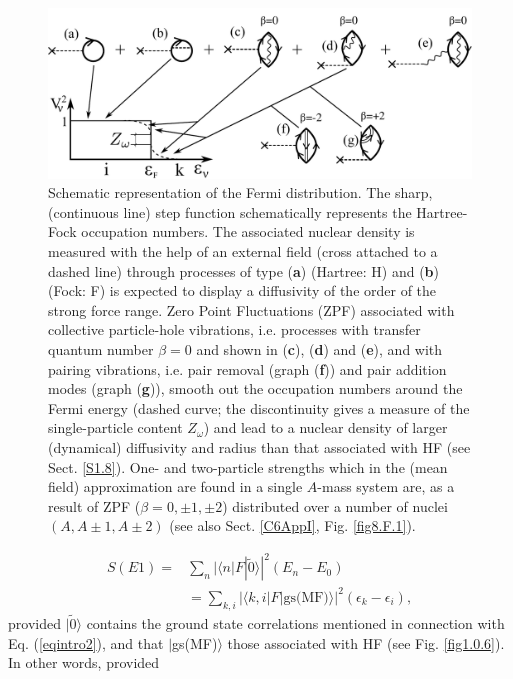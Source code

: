 \begin{figure}
\centerline {
\includegraphics*[width=12cm]{introduccion/figs/fig1_2_2}
}
\caption{   Schematic representation of the Fermi distribution. The sharp, (continuous line)  step function schematically represents the Hartree-Fock occupation numbers. The associated nuclear density is measured with the help of an external field (cross attached to a dashed line) through processes of type (\textbf{a}) (Hartree: H) and (\textbf{b}) (Fock: F) is expected to display a diffusivity of the order of the strong force range. Zero Point Fluctuations (ZPF) associated with collective particle-hole vibrations, i.e. processes with transfer quantum number $\beta=0$  and shown in (\textbf{c}), (\textbf{d}) and (\textbf{e}), and with pairing vibrations, i.e. pair removal (graph (\textbf{f})) and pair addition modes (graph (\textbf{g})), smooth out the occupation numbers around the Fermi energy (dashed curve; the discontinuity gives a measure of the single-particle content $Z_\omega$) and lead to a  nuclear density of larger (dynamical) diffusivity and radius than that associated with HF (see Sect. \ref{S1.8}). One- and two-particle strengths which in the (mean field) approximation are found in a single $A$-mass system are, as a result of ZPF ($\beta=0,\pm 1, \pm 2$) distributed over a number of nuclei $(A, A\pm 1, A\pm 2)$ (see also Sect. \ref{C6AppI}, Fig. \ref{fig8.F.1}).}
\label{fig1.2.2}
\end{figure}
\begin{align}\label{eqintro6}
\nonumber S(E1)=&\sum_n |\langle n|F|\tilde 0\rangle|^2(E_n-E_0)\\
&=\sum_{k,i}|\langle k,i|F|\text{gs(MF)}\rangle|^2(\epsilon_{k}-\epsilon_i),
\end{align}
provided $|\tilde 0\rangle$ contains the ground state correlations mentioned in connection with Eq. (\ref{eqintro2}), and that $|$gs(MF)$\rangle$ those associated with HF (see Fig. \ref{fig1.0.6}). In other words, provided
